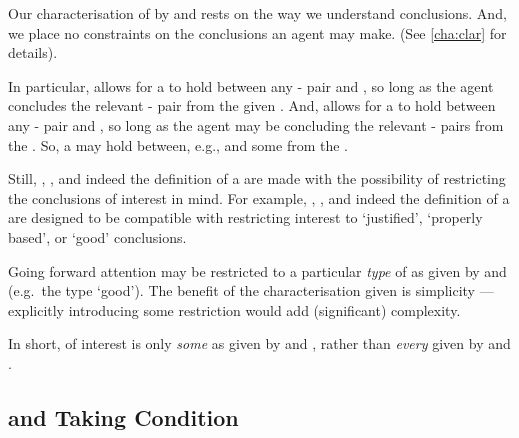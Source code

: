 \begin{note}
  Our characterisation of  by \supportI{} and \supportII{} rests on the way we understand conclusions.
  And, we place no constraints on the conclusions an agent may make.
  (See \autoref{cha:clar} for details).

  In particular, \supportI{} allows for a \fingfr{} to hold between any - pair and , so long as the agent concludes the relevant - pair from the given \pool{}.
  And, \supportII{} allows for a \fingfr{} to hold between any - pair and , so long as the agent may be concluding the relevant - pairs from the \pool{}.
  So, a \fingfr{} may hold between, e.g.,  and some \pool{} from the \agpe{}.

  Still, \supportI{}, \supportII{}, and indeed the definition of a \fc{} are made with the possibility of restricting the conclusions of interest in mind.
  For example, \supportI{}, \supportII{}, and indeed the definition of a \fc{} are designed to be compatible with restricting interest to `justified', `properly based', or `good' conclusions.

  Going forward attention may be restricted to a particular \emph{type} of \fingfr{} as given by \supportI{} and \supportII{} (e.g.\ the type `good').
  The benefit of the characterisation given is simplicity --- explicitly introducing some restriction would add (significant) complexity.

  In short, of interest is only \emph{some}  as given by \supportI{} and \supportII{}, rather than \emph{every} \fingfr{} given by \supportI{} and \supportII{}.
\end{note}




\subsection*{\supportI{} and \citeauthor{Boghossian:2014aa} Taking Condition}



